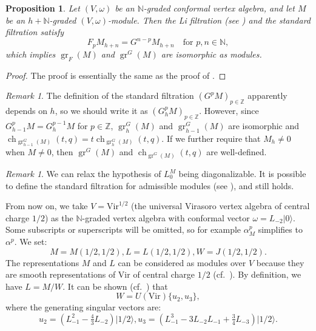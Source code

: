 \documentclass[a4paper, 12pt, reqno]{amsart}
\newtheorem{proposition}[theorem]{Proposition}
\theoremstyle{remark}
\newtheorem{remark}[theorem]{Remark}
\DeclareMathOperator{\gr}{gr}
\DeclareMathOperator{\ch}{ch}
\newcommand{\vac}{{|0\rangle}}
\newcommand{\vachalf}{{|1/2\rangle}}
\newcommand{\Vir}{{\mathrm{Vir}}}
\begin{document}
\begin{proposition}
  \label{prp:4}
  Let $(V, \omega)$ be an $\mathbb{N}$-graded conformal vertex algebra, and let $M$ be an $h + \mathbb{N}$-graded $(V, \omega)$-module.
  Then the Li filtration (see \cite{li_abelianizing_2005}) and the standard filtration satisfy
  \begin{equation*}
    F_pM_{h + n} = G^{n - p}M_{h + n} \quad \text{for $p, n \in \mathbb{N}$},
  \end{equation*}
  which implies $\gr_F(M)$ and $\gr^G(M)$ are isomorphic as modules.
\end{proposition}

\begin{proof}
  The proof is essentially the same as the proof of \cite[Proposition 2.6.1]{arakawa_remark_2012}.
\end{proof}

\begin{remark}
  \label{rmk:2}
  The definition of the standard filtration $(G^pM)_{p \in \mathbb{Z}}$ apparently depends on $h$, so we should write it as $(G^p_hM)_{p \in \mathbb{Z}}$.
  However, since $G^p_{h - 1}M = G^{p - 1}_hM$ for $p \in \mathbb{Z}$, $\gr^G_h(M)$ and $\gr^G_{h - 1}(M)$ are isomorphic and $\ch_{\gr^G_{h - 1}(M)}(t, q) = t\ch_{\gr^G_h(M)}(t, q)$.
  If we further require that $M_h \neq 0$ when $M \neq 0$, then $\gr^G(M)$ and $\ch_{\gr^G(M)}(t, q)$ are well-defined.
\end{remark}

\begin{remark}
  \label{rmk:3}
  We can relax the hypothesis of $L_0^M$ being diagonalizable.
  It is possible to define the standard filtration for admissible modules (see \cite[Definition 3.3]{dong_twisted_1998}), and  still holds.
\end{remark}

From now on, we take $V = \Vir^{1/2}$ (the universal Virasoro vertex algebra of central charge $1/2$) as the $\mathbb{N}$-graded vertex algebra with conformal vector $\omega = L_{-2}\vac$.
Some subscripts or superscripts will be omitted, so for example $\alpha^p_M$ simplifies to $\alpha^p$.
We set:
\begin{equation*}
  M = M(1/2, 1/2), L = L(1/2, 1/2), W = J(1/2, 1/2).
\end{equation*}
The representations $M$ and $L$ can be considered as modules over $V$ because they are smooth representations of $\Vir$ of central charge $1/2$ (cf.\ \cite[Theorem 6.1.7]{lepowsky_introduction_2004}).
By definition, we have $L = M/W$.
It can be shown (cf.\ \cite{astashkevich_structure_1997}) that
\begin{equation}
  \label{eq:3}
  W = U(\Vir)\{u_2, u_3\},
\end{equation}
where the generating singular vectors are:
\begin{equation}
  \label{eq:4}
  u_2 = (L_{-1}^2 - \tfrac{4}{3}L_{-2})\vachalf, u_3 = (L_{-1}^3 - 3L_{-2}L_{-1} + \tfrac{3}{4}L_{-3})\vachalf.
\end{equation}
\end{document}
